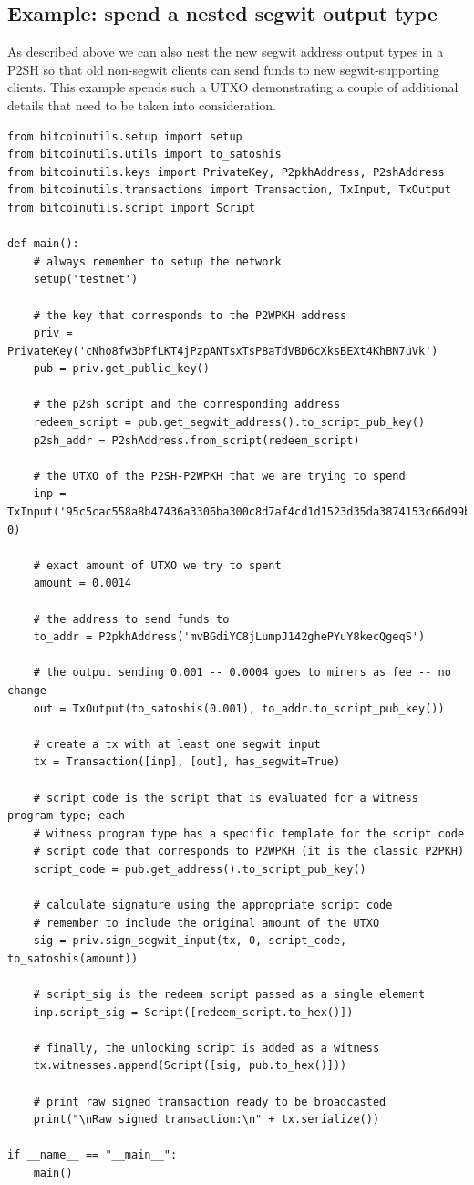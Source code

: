 \subsection*{Example: spend a nested segwit output type}
As described above we can also nest the new segwit address output types in a P2SH so that old non-segwit clients can send funds to new segwit-supporting clients. This example spends such a UTXO demonstrating a couple of additional details that need to be taken into consideration.

\vspace{1em}
\begin{lstlisting}[style=Python]
from bitcoinutils.setup import setup
from bitcoinutils.utils import to_satoshis
from bitcoinutils.keys import PrivateKey, P2pkhAddress, P2shAddress
from bitcoinutils.transactions import Transaction, TxInput, TxOutput
from bitcoinutils.script import Script

def main():
    # always remember to setup the network
    setup('testnet')

    # the key that corresponds to the P2WPKH address
    priv = PrivateKey('cNho8fw3bPfLKT4jPzpANTsxTsP8aTdVBD6cXksBEXt4KhBN7uVk')
    pub = priv.get_public_key()

    # the p2sh script and the corresponding address
    redeem_script = pub.get_segwit_address().to_script_pub_key()
    p2sh_addr = P2shAddress.from_script(redeem_script)

    # the UTXO of the P2SH-P2WPKH that we are trying to spend
    inp = TxInput('95c5cac558a8b47436a3306ba300c8d7af4cd1d1523d35da3874153c66d99b09', 0)

    # exact amount of UTXO we try to spent
    amount = 0.0014

    # the address to send funds to
    to_addr = P2pkhAddress('mvBGdiYC8jLumpJ142ghePYuY8kecQgeqS')

    # the output sending 0.001 -- 0.0004 goes to miners as fee -- no change
    out = TxOutput(to_satoshis(0.001), to_addr.to_script_pub_key())

    # create a tx with at least one segwit input
    tx = Transaction([inp], [out], has_segwit=True)

    # script code is the script that is evaluated for a witness program type; each
    # witness program type has a specific template for the script code
    # script code that corresponds to P2WPKH (it is the classic P2PKH)
    script_code = pub.get_address().to_script_pub_key()

    # calculate signature using the appropriate script code
    # remember to include the original amount of the UTXO
    sig = priv.sign_segwit_input(tx, 0, script_code, to_satoshis(amount))

    # script_sig is the redeem script passed as a single element
    inp.script_sig = Script([redeem_script.to_hex()])

    # finally, the unlocking script is added as a witness
    tx.witnesses.append(Script([sig, pub.to_hex()]))

    # print raw signed transaction ready to be broadcasted
    print("\nRaw signed transaction:\n" + tx.serialize())

if __name__ == "__main__":
    main()
\end{lstlisting}
